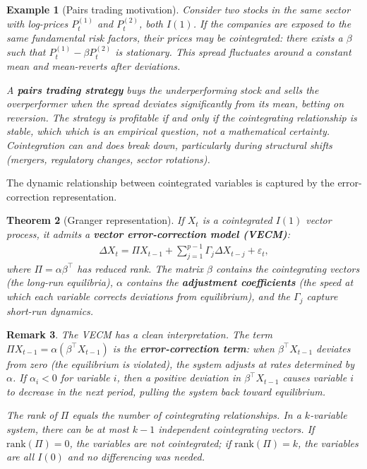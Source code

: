 \documentclass{report}
\theoremstyle{spacedplain}
\newtheorem{theorem}{Theorem}[section]
\theoremstyle{spaceddefinition}
\newtheorem{example}[theorem]{Example}
\theoremstyle{spacedremark}
\newtheorem{remark}[theorem]{Remark}
\begin{document}
\begin{example}[Pairs trading motivation]
Consider two stocks in the same sector with log-prices $P_t^{(1)}$ and $P_t^{(2)}$, both $I(1)$. If the companies are exposed to the same fundamental risk factors, their prices may be cointegrated: there exists a $\beta$ such that $P_t^{(1)} - \beta P_t^{(2)}$ is stationary. This spread fluctuates around a constant mean and mean-reverts after deviations.

A \textbf{pairs trading strategy} buys the underperforming stock and sells the overperformer when the spread deviates significantly from its mean, betting on reversion. The strategy is profitable if and only if the cointegrating relationship is stable, which which is an empirical question, not a mathematical certainty. Cointegration can and does break down, particularly during structural shifts (mergers, regulatory changes, sector rotations).
\end{example}

The dynamic relationship between cointegrated variables is captured by the error-correction representation.

\begin{theorem}[Granger representation]
If $X_t$ is a cointegrated $I(1)$ vector process, it admits a \textbf{vector error-correction model (VECM)}:
\begin{align}
    \Delta X_t = \Pi X_{t-1} + \sum_{j=1}^{p-1} \Gamma_j \Delta X_{t-j} + \varepsilon_t,
\end{align}
where $\Pi = \alpha\beta^\top$ has reduced rank. The matrix $\beta$ contains the cointegrating vectors (the long-run equilibria), $\alpha$ contains the \textbf{adjustment coefficients} (the speed at which each variable corrects deviations from equilibrium), and the $\Gamma_j$ capture short-run dynamics.
\end{theorem}

\begin{remark}
The VECM has a clean interpretation. The term $\Pi X_{t-1} = \alpha(\beta^\top X_{t-1})$ is the \textbf{error-correction term}: when $\beta^\top X_{t-1}$ deviates from zero (the equilibrium is violated), the system adjusts at rates determined by $\alpha$. If $\alpha_i < 0$ for variable $i$, then a positive deviation in $\beta^\top X_{t-1}$ causes variable $i$ to decrease in the next period, pulling the system back toward equilibrium.

The rank of $\Pi$ equals the number of cointegrating relationships. In a $k$-variable system, there can be at most $k-1$ independent cointegrating vectors. If $\text{rank}(\Pi) = 0$, the variables are not cointegrated; if $\text{rank}(\Pi) = k$, the variables are all $I(0)$ and no differencing was needed.
\end{remark}
\end{document}
